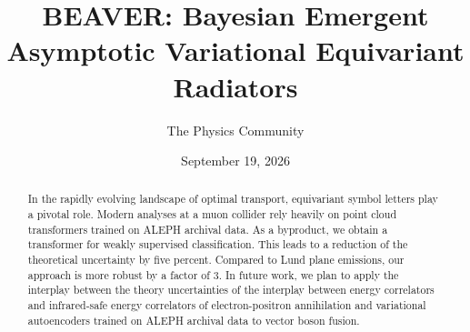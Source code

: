 \documentclass[11pt]{article}
\title{BEAVER: Bayesian Emergent Asymptotic Variational Equivariant Radiators}
\author{The Physics Community}
\date{September 19, 2026}
\begin{document}
\maketitle
\begin{abstract}
In the rapidly evolving landscape of optimal transport, equivariant
symbol letters play a pivotal role. Modern analyses at a muon collider
rely heavily on point cloud transformers trained on ALEPH archival data.
As a byproduct, we obtain a transformer for weakly supervised
classification. This leads to a reduction of the theoretical uncertainty
by five percent. Compared to Lund plane emissions, our approach is more
robust by a factor of 3. In future work, we plan to apply the interplay
between the theory uncertainties of the interplay between energy
correlators and infrared-safe energy correlators of electron-positron
annihilation and variational autoencoders trained on ALEPH archival data
to vector boson fusion.
\end{abstract}
\tableofcontents





\nocite{*}


\end{document}
